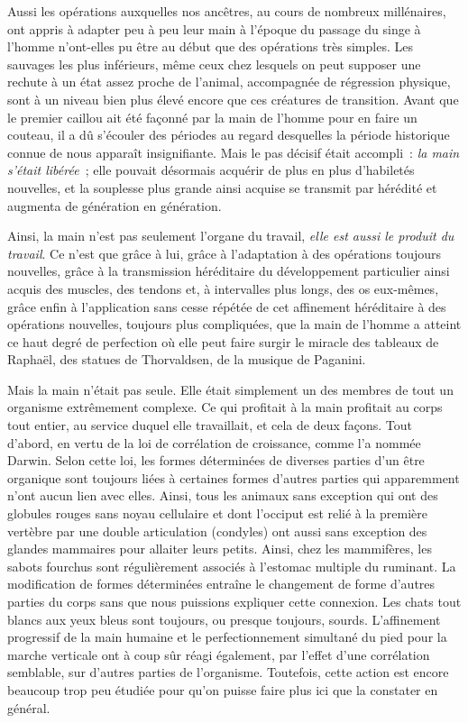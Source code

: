 \documentclass[french,twoside]{book} %
\begin{document}
Aussi les opérations auxquelles nos ancêtres, au cours de nombreux millénaires, ont appris à adapter peu à peu leur main à l’époque du passage du singe à l’homme n’ont-elles pu être au début que des opérations très simples. Les sauvages les plus inférieurs, même ceux chez lesquels on peut supposer une rechute à un état assez proche de l’animal, accompagnée de régression physique, sont à un niveau bien plus élevé encore que ces créatures de transition. Avant que le premier caillou ait été façonné par la main de l’homme pour en faire un couteau, il a dû s’écouler des périodes au regard desquelles la période historique connue de nous apparaît insignifiante. Mais le pas décisif était accompli : \emph{la main s’était libérée} ; elle pouvait désormais acquérir de plus en plus d’habiletés nouvelles, et la souplesse plus grande ainsi acquise se transmit par hérédité et augmenta de génération en génération.\par
Ainsi, la main n’est pas seulement l’organe du travail, \emph{elle est aussi le produit du travail}. Ce n’est que grâce à lui, grâce à l’adaptation à des opérations toujours nouvelles, grâce à la transmission héréditaire du développement particulier ainsi acquis des muscles, des tendons et, à intervalles plus longs, des os eux-mêmes, grâce enfin à l’application sans cesse répétée de cet affinement héréditaire à des opérations nouvelles, toujours plus compliquées, que la main de l’homme a atteint ce haut degré de perfection où elle peut faire surgir le miracle des tableaux de Raphaël, des statues de Thorvaldsen, de la musique de Paganini.\par
Mais la main n’était pas seule. Elle était simplement un des membres de tout un organisme extrêmement complexe. Ce qui profitait à la main profitait au corps tout entier, au service duquel elle travaillait, et cela de deux façons. Tout d’abord, en vertu de la loi de corrélation de croissance, comme l’a nommée Darwin. Selon cette loi, les formes déterminées de diverses parties d’un être organique sont toujours liées à certaines formes d’autres parties qui apparemment n’ont aucun lien avec elles. Ainsi, tous les animaux sans exception qui ont des globules rouges sans noyau cellulaire et dont l’occiput est relié à la première vertèbre par une double articulation (condyles) ont aussi sans exception des glandes mammaires pour allaiter leurs petits. Ainsi, chez les mammifères, les sabots fourchus sont régulièrement associés à l’estomac multiple du ruminant. La modification de formes déterminées entraîne le changement de forme d’autres parties du corps sans que nous puissions expliquer cette connexion. Les chats tout blancs aux yeux bleus sont toujours, ou presque toujours, sourds. L’affinement progressif de la main humaine et le perfectionnement simultané du pied pour la marche verticale ont à coup sûr réagi également, par l’effet d’une corrélation semblable, sur d’autres parties de l’organisme. Toutefois, cette action est encore beaucoup trop peu étudiée pour qu’on puisse faire plus ici que la constater en général.\par
\end{document}
